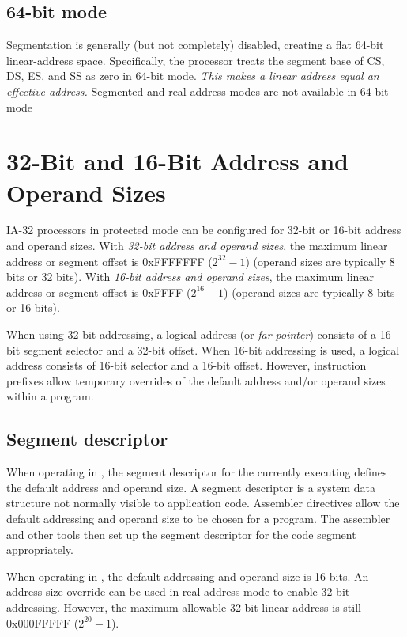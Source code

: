 \subsection{64-bit mode}
Segmentation is generally (but not completely) disabled, creating a flat
64-bit linear-address space. Specifically, the processor treats the segment
base of CS, DS, ES, and SS as zero in 64-bit mode. {\em This makes a linear
  address equal an effective address. \/} Segmented and real address modes are
not available in 64-bit mode


\section{32-Bit and 16-Bit Address and Operand Sizes}
IA-32 processors in protected mode can be configured for 32-bit or 16-bit
address and operand sizes. With {\em 32-bit address and operand sizes\/}, 
the maximum linear address or segment offset is 0xFFFFFFF ($2^{32} - 1$)
(operand sizes are typically 8 bits or 32 bits). With {\em 16-bit address
  and operand sizes\/}, the maximum linear address or segment offset is
0xFFFF ($2^{16} - 1$) (operand sizes are typically 8 bits or 16 bits). 

When using 32-bit addressing, a logical address (or {\em far pointer\/})
consists of a 16-bit segment selector and a 32-bit offset. When 16-bit
addressing is used, a logical address consists of 16-bit selector and a 16-bit
offset. However, instruction prefixes allow temporary overrides of the default
address and/or operand sizes within a program.

\subsection{Segment descriptor}
When operating in , the segment descriptor for the
currently executing  defines the default address and
operand size.  A segment descriptor is a system data structure not normally
visible to application code. Assembler directives allow the default addressing
and operand size to be chosen for a program. The assembler and other tools
then set up the segment descriptor for the code segment appropriately. 

When operating in , the default addressing and operand
size is 16 bits. An address-size override can be used in real-address mode to
enable 32-bit addressing. However, the maximum allowable 32-bit linear address
is still 0x000FFFFF ($2^{20} - 1$). 

